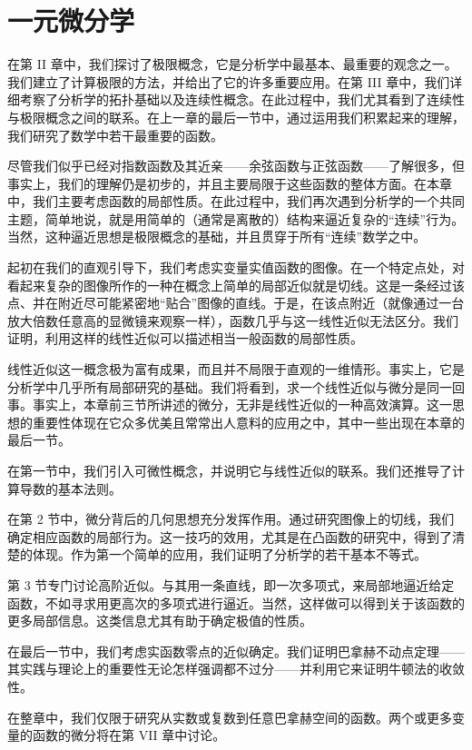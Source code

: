 \chapter{一元微分学}
在第 II 章中，我们探讨了极限概念，它是分析学中最基本、最重要的观念之一。我们建立了计算极限的方法，并给出了它的许多重要应用。在第 III 章中，我们详细考察了分析学的拓扑基础以及连续性概念。在此过程中，我们尤其看到了连续性与极限概念之间的联系。在上一章的最后一节中，通过运用我们积累起来的理解，我们研究了数学中若干最重要的函数。

尽管我们似乎已经对指数函数及其近亲——余弦函数与正弦函数——了解很多，但事实上，我们的理解仍是初步的，并且主要局限于这些函数的整体方面。在本章中，我们主要考虑函数的局部性质。在此过程中，我们再次遇到分析学的一个共同主题，简单地说，就是用简单的（通常是离散的）结构来逼近复杂的“连续”行为。当然，这种逼近思想是极限概念的基础，并且贯穿于所有“连续”数学之中。

起初在我们的直观引导下，我们考虑实变量实值函数的图像。在一个特定点处，对看起来复杂的图像所作的一种在概念上简单的局部近似就是切线。这是一条经过该点、并在附近尽可能紧密地“贴合”图像的直线。于是，在该点附近（就像通过一台放大倍数任意高的显微镜来观察一样），函数几乎与这一线性近似无法区分。我们证明，利用这样的线性近似可以描述相当一般函数的局部性质。

线性近似这一概念极为富有成果，而且并不局限于直观的一维情形。事实上，它是分析学中几乎所有局部研究的基础。我们将看到，求一个线性近似与微分是同一回事。事实上，本章前三节所讲述的微分，无非是线性近似的一种高效演算。这一思想的重要性体现在它众多优美且常常出人意料的应用之中，其中一些出现在本章的最后一节。

在第一节中，我们引入可微性概念，并说明它与线性近似的联系。我们还推导了计算导数的基本法则。

在第 2 节中，微分背后的几何思想充分发挥作用。通过研究图像上的切线，我们确定相应函数的局部行为。这一技巧的效用，尤其是在凸函数的研究中，得到了清楚的体现。作为第一个简单的应用，我们证明了分析学的若干基本不等式。

第 3 节专门讨论高阶近似。与其用一条直线，即一次多项式，来局部地逼近给定函数，不如寻求用更高次的多项式进行逼近。当然，这样做可以得到关于该函数的更多局部信息。这类信息尤其有助于确定极值的性质。

在最后一节中，我们考虑实函数零点的近似确定。我们证明巴拿赫不动点定理——其实践与理论上的重要性无论怎样强调都不过分——并利用它来证明牛顿法的收敛性。

在整章中，我们仅限于研究从实数或复数到任意巴拿赫空间的函数。两个或更多变量的函数的微分将在第 VII 章中讨论。

